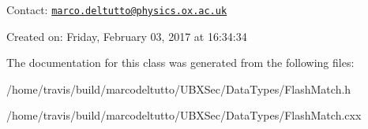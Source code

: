 Contact\-: \href{mailto:marco.deltutto@physics.ox.ac.uk}{\tt marco.\-deltutto@physics.\-ox.\-ac.\-uk}

Created on\-: Friday, February 03, 2017 at 16\-:34\-:34 

The documentation for this class was generated from the following files\-:\begin{DoxyCompactItemize}
\item 
/home/travis/build/marcodeltutto/\-U\-B\-X\-Sec/\-Data\-Types/Flash\-Match.\-h\item 
/home/travis/build/marcodeltutto/\-U\-B\-X\-Sec/\-Data\-Types/Flash\-Match.\-cxx\end{DoxyCompactItemize}

